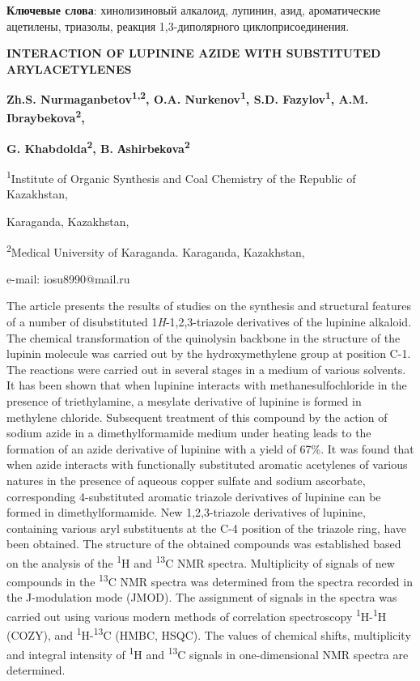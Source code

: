 {\bfseries Ключевые слова}: хинолизиновый алкалоид, лупинин, азид,
ароматические ацетилены, триазолы, реакция 1,3-диполярного
циклоприсоединения.

\begin{center}
{\large\bfseries INTERACTION OF LUPININE AZIDE WITH SUBSTITUTED ARYLACETYLENES}

{\bfseries Zh.S. Nurmaganbetov\textsuperscript{1,2}, O.A.
Nurkenov\textsuperscript{1}, S.D. Fazylov\textsuperscript{1}, A.M.
Ibraybekova\textsuperscript{2},}

{\bfseries G. Khabdolda\textsuperscript{2}, B.
Аshirbеkоva\textsuperscript{2}}

\textsuperscript{1}Institute of Organic Synthesis and Coal Chemistry of
the Republic of Kazakhstan,

Karaganda, Kazakhstan,

\textsuperscript{2}Medical University of Karaganda. Karaganda,
Kazakhstan,

e-mail: iosu8990@mail.ru
\end{center}

The article presents the results of studies on the synthesis and
structural features of a number of disubstituted
1\emph{H}-1,2,3-triazole derivatives of the lupinine alkaloid. The
chemical transformation of the quinolysin backbone in the structure of
the lupinin molecule was carried out by the hydroxymethylene group at
position C-1. The reactions were carried out in several stages in a
medium of various solvents. It has been shown that when lupinine
interacts with methanesulfochloride in the presence of triethylamine, a
mesylate derivative of lupinine is formed in methylene chloride.
Subsequent treatment of this compound by the action of sodium azide in a
dimethylformamide medium under heating leads to the formation of an
azide derivative of lupinine with a yield of 67\%. It was found that
when azide interacts with functionally substituted aromatic acetylenes
of various natures in the presence of aqueous copper sulfate and sodium
ascorbate, corresponding 4-substituted aromatic triazole derivatives of
lupinine can be formed in dimethylformamide. New 1,2,3-triazole
derivatives of lupinine, containing various aryl substituents at the C-4
position of the triazole ring, have been obtained. The structure of the
obtained compounds was established based on the analysis of the
\textsuperscript{1}H and \textsuperscript{13}C NMR spectra. Multiplicity
of signals of new compounds in the \textsuperscript{13}C NMR spectra was
determined from the spectra recorded in the J-modulation mode (JMOD).
The assignment of signals in the spectra was carried out using various
modern methods of correlation spectroscopy
\textsuperscript{1}H-\textsuperscript{1}H (COZY), and
\textsuperscript{1}H-\textsuperscript{13}C (HMBC, HSQC). The values of
chemical shifts, multiplicity and integral intensity of
\textsuperscript{1}H and \textsuperscript{13}C signals in
one-dimensional NMR spectra are determined.

